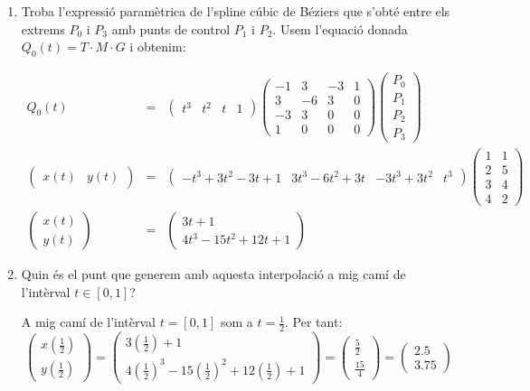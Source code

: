 \begin{enumerate}
  \item Troba l'expressió paramètrica de l'spline cúbic de Béziers que s'obté entre els extrems $P_0$ i $P_3$ amb punts de control $P_1$ i $P_2$.
Usem l'equació donada $Q_0(t)=T\cdot M \cdot G$ i obtenim:

\begin{eqnarray*}
  Q_0(t)&=&\begin{pmatrix}t^3 & t^2 & t & 1\end{pmatrix}
  \begin{pmatrix}
      -1 & 3 & -3 & 1 \\
      3 & -6 & 3 & 0 \\
      -3 & 3 & 0 & 0 \\
      1 & 0 & 0 & 0
  \end{pmatrix}
  \begin{pmatrix}
      P_0 \\
      P_1 \\
      P_2 \\
      P_3
  \end{pmatrix}\\
  \begin{pmatrix}
    x(t)&
    y(t)
  \end{pmatrix}&=&
  \begin{pmatrix}-t^3+3t^2-3t+1 & 3t^3-6t^2+3t& -3t^3+3t^2&t^3\end{pmatrix}
  \begin{pmatrix}
      1 &1 \\
      2 & 5\\
      3 & 4 \\
      4 & 2
  \end{pmatrix}\\
  \begin{pmatrix}
    x(t)\\
    y(t)
  \end{pmatrix}&=&
  \begin{pmatrix}
    3t+1\\
    4t^3-15t^2+12t+1
  \end{pmatrix}
\end{eqnarray*}

  \item Quin és el punt que generem amb aquesta interpolació a mig camí de l'intèrval $t\in[0,1]$?

A mig camí de l'intèrval $t=[0,1]$ som a $t=\frac{1}{2}$. Per tant:
\[
\begin{pmatrix}
  x(\frac{1}{2})\\
  y(\frac{1}{2})
\end{pmatrix}=
\begin{pmatrix}
  3(\frac{1}{2})+1\\
  4(\frac{1}{2})^3-15(\frac{1}{2})^2+12(\frac{1}{2})+1
\end{pmatrix}=
\begin{pmatrix}
  \frac{5}{2}\\
  \frac{15}{4}
\end{pmatrix}=
\begin{pmatrix}
  2.5\\
  3.75
\end{pmatrix}
\]


\end{enumerate}
